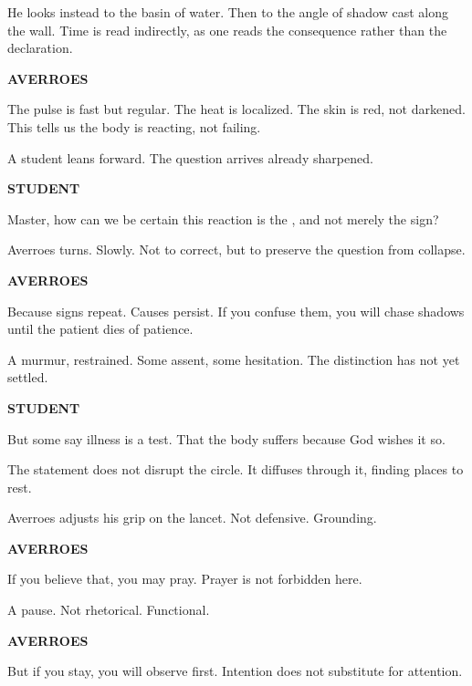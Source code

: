 He looks instead to the basin of water. Then to the angle of shadow cast
along the wall. Time is read indirectly, as one reads the consequence rather
than the declaration.

\medskip

\textbf{AVERROES}

The pulse is fast but regular. The heat is localized. The skin is red, not
darkened. This tells us the body is reacting, not failing.

\medskip

A student leans forward. The question arrives already sharpened.

\medskip

\textbf{STUDENT}

Master, how can we be certain this reaction is the , and not
merely the sign?

\medskip

Averroes turns. Slowly. Not to correct, but to preserve the question from
collapse.

\medskip

\textbf{AVERROES}

Because signs repeat. Causes persist. If you confuse them, you will chase
shadows until the patient dies of patience.

\medskip

A murmur, restrained. Some assent, some hesitation. The distinction has not
yet settled.

\medskip

\textbf{STUDENT}

But some say illness is a test. That the body suffers because God wishes
it so.

\medskip

The statement does not disrupt the circle. It diffuses through it, finding
places to rest.

Averroes adjusts his grip on the lancet. Not defensive. Grounding.

\medskip

\textbf{AVERROES}

If you believe that, you may pray. Prayer is not forbidden here.

\medskip

A pause. Not rhetorical. Functional.

\medskip

\textbf{AVERROES}

But if you stay, you will observe first. Intention does not substitute for
attention.

